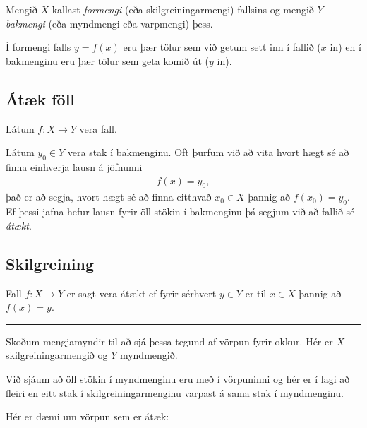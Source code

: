\documentclass[a4paper,10pt,icelandic]{sphinxmanual}
\begin{document}
Mengið \(X\) kallast \textit{formengi} (eða skilgreiningarmengi) fallsins og mengið \(Y\) \textit{bakmengi} (eða myndmengi eða varpmengi) þess.

Í formengi falls \(y=f(x)\) eru þær tölur sem við getum sett inn í fallið (\(x\) \sphinxhyphen{}in) en í bakmenginu eru þær tölur sem geta komið út (\(y\) \sphinxhyphen{}in).


\subsection{Átæk föll}
\label{\detokenize{Kafli09:ataek-foll}}
Látum \(f: X \to Y\) vera fall.

Látum \(y_0 \in Y\) vera stak í bakmenginu.
Oft þurfum við að vita hvort hægt sé að finna einhverja lausn á jöfnunni
\begin{equation*}
\begin{split}f(x)=y_0,\end{split}
\end{equation*}
það er að segja, hvort hægt sé að finna eitthvað \(x_0 \in X\) þannig að \(f(x_0)=y_0\).
Ef þessi jafna hefur lausn fyrir öll stökin í bakmenginu þá segjum við að fallið sé \textit{átækt}.


\subsection{Skilgreining}
\label{\detokenize{Kafli09:skilgreining}}
Fall \(f: X \to Y\) er sagt vera átækt ef fyrir sérhvert \(y \in Y\) er til \(x \in X\) þannig að \(f(x)=y\).


\bigskip\hrule\bigskip


Skoðum mengjamyndir til að sjá þessa tegund af vörpun fyrir okkur.
Hér er \(X\) skilgreiningarmengið og \(Y\) myndmengið.


Við sjáum að öll stökin í myndmenginu eru með í vörpuninni og hér er í lagi að fleiri en eitt stak í skilgreiningarmenginu varpast á sama stak í myndmenginu.

Hér er dæmi um vörpun sem er  átæk:

\end{document}
